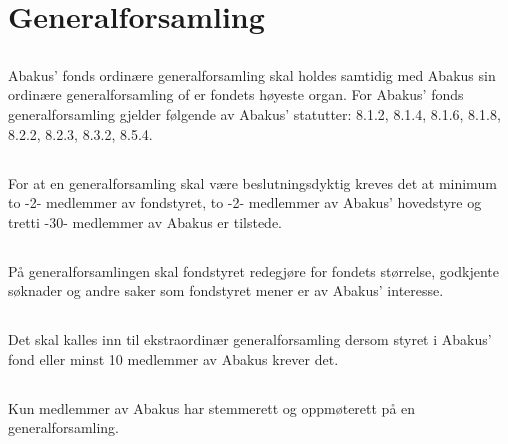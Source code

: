 \section{Generalforsamling}

\subsection{}
Abakus’ fonds ordinære generalforsamling skal holdes samtidig med Abakus sin
ordinære generalforsamling of er fondets høyeste organ. For Abakus’ fonds
generalforsamling gjelder følgende av Abakus’ statutter: 8.1.2, 8.1.4, 8.1.6,
8.1.8, 8.2.2, 8.2.3, 8.3.2, 8.5.4.

\subsection{}
For at en generalforsamling skal være beslutningsdyktig kreves det at minimum
to -2- medlemmer av fondstyret, to -2- medlemmer av Abakus’ hovedstyre og tretti
-30- medlemmer av Abakus er tilstede.

\subsection{}
På generalforsamlingen skal fondstyret redegjøre for fondets størrelse,
godkjente søknader og andre saker som fondstyret mener er av Abakus’
interesse. 

\subsection{}
Det skal kalles inn til ekstraordinær generalforsamling dersom styret i
Abakus’ fond eller minst 10 medlemmer av Abakus krever det.

\subsection{}
Kun medlemmer av Abakus har stemmerett og oppmøterett på en generalforsamling.
